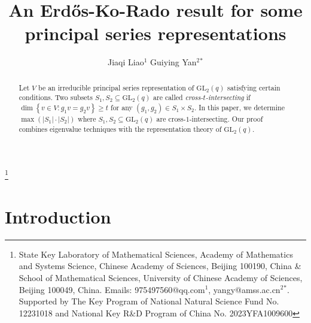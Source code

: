 \documentclass[12pt, reqno]{amsart}
\theoremstyle{definition}
\theoremstyle{remark}
\numberwithin{equation}{section}
\newcommand{\gs}{\geqslant}
\newcommand{\pt}[1]{\left(#1\right)}
\newcommand{\cb}[1]{\left\{#1\right\}}
\newcommand{\abs}[1]{\left|#1\right|}
\newcommand{\GL}{\mathrm{GL}}
\begin{document}
	\setcounter{page}{1}
	
	
	\centerline{}
	
	\centerline{}
	
	
	
	\title[]{A\lowercase{n} E\lowercase{rd\H{o}s}-K\lowercase{o}-R\lowercase{ado result for some principal series representations}}
	
	\author[]{J\lowercase{iaqi} L\lowercase{iao}$^1$ \qquad G\lowercase{uiying} Y\lowercase{an}$^2$$^*$}
	
	
	
\thanks{State Key Laboratory of Mathematical Sciences, Academy of Mathematics and Systems Science, Chinese Academy of Sciences, Beijing 100190, China \& School of Mathematical Sciences, University of Chinese Academy of Sciences, Beijing 100049, China. Emails: 975497560@qq.com$^1$, yangy@amss.ac.cn$^2$$^*$. Supported by The Key Program of National Natural Science Fund No. 12231018 and National Key R\&D Program of China No. 2023YFA1009600 }

\begin{abstract}

Let $V$ be an irreducible principal series representation of $\GL_2(q)$ satisfying certain conditions. Two subsets $S_1, S_2 \subseteq \GL_2(q)$ are called \emph{cross-$t$-intersecting} if $\dim\cb{v \in V: g_1v = g_2v} \gs t$ for any $\pt{g_1, g_2} \in S_1 \times S_2$. In this paper, we determine $\max\pt{\abs{S_1}\cdot\abs{S_2}}$ where $S_1, S_2 \subseteq \GL_2(q)$ are cross-$1$-intersecting. Our proof combines eigenvalue techniques with the representation theory of $\GL_2(q)$.

\end{abstract} \maketitle
	
\section{Introduction}
\end{document}
